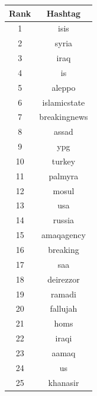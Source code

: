\documentclass[conference]{IEEEtran}
\begin{document}
    \begin{table}[ht]
        \begin{tabular} { | c | c | }
            \hline
            Rank & Hashtag         \\
            \hline
            1    & isis            \\
            \hline
            2    & syria           \\
            \hline
            3    & iraq            \\
            \hline
            4    & is              \\
            \hline
            5    & aleppo          \\
            \hline
            6    & islamicstate    \\
            \hline
            7    & breakingnews    \\
            \hline
            8    & assad           \\
            \hline
            9    & ypg             \\
            \hline
            10   & turkey          \\
            \hline
            11   & palmyra         \\
            \hline
            12   & mosul           \\
            \hline
            13   & usa             \\
            \hline
            14   & russia          \\
            \hline
            15   & amaqagency      \\
            \hline
            16   & breaking        \\
            \hline
            17   & saa             \\
            \hline
            18   & deirezzor       \\
            \hline
            19   & ramadi          \\
            \hline
            20   & fallujah        \\
            \hline
            21   & homs            \\
            \hline
            22   & iraqi           \\
            \hline
            23   & aamaq           \\
            \hline
            24   & us              \\
            \hline
            25   & khanasir        \\

\end{tabular}
\end{table}
\end{document}

